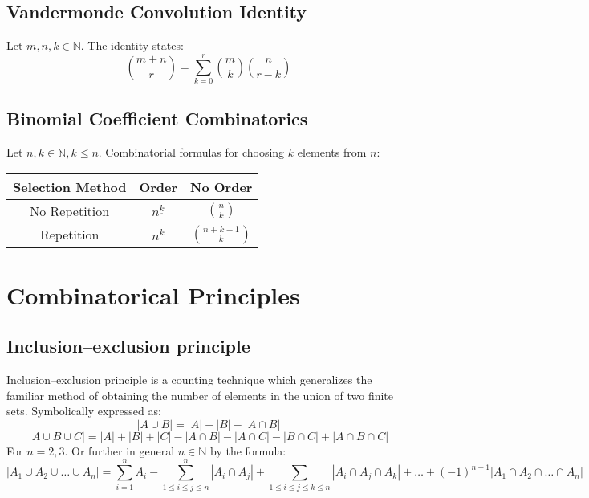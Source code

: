 \documentclass{article}
\newenvironment{definition}[1]{%
    \trivlist
    \item[\hskip\labelsep\textbf{Definition. #1.}]
    \ignorespaces
}{%
    \endtrivlist
}
\newenvironment{theorem}[1]{%
    \trivlist
    \item[\hskip\labelsep\textbf{Theorem. #1.}]
    \ignorespaces
}{%
    \endtrivlist
}
\newenvironment{information}[1]{%
    \trivlist
    \item[\hskip\labelsep\textbf{Information. #1.}]
    \ignorespaces
}{%
    \endtrivlist
}
\begin{document}
\subsection{Vandermonde Convolution Identity}

\begin{theorem}{Vandermonde's Convolution Identity}
    Let $m,n, k \in \mathbb{N}$. The identity states:
    \[\binom{m+n}{r}=\sum _{k=0}^{r}\binom{m}{k}\binom{n}{r-k}\]
\end{theorem}

\subsection{Binomial Coefficient Combinatorics}

\begin{information}{Choosing $k$ elements from $n$}
    Let $n, k \in\mathbb{N}, k\leq n$. Combinatorial formulas for choosing \( k \) elements from \( n \):
    \begin{table}[htbp]
        \centering
        \bgroup
        \def\arraystretch{1.5}%
        \begin{tabular}{|c|c|c|}
            \hline
            \textbf{Selection Method} & \textbf{Order} & \textbf{No Order} \\
            \hline
            No Repetition & \( n^{\underline{k}} \) & \( \binom{n}{k} \) \\
            \hline
            Repetition & \( n^{k} \) & \( \binom{n+k-1}{k} \) \\
            \hline
        \end{tabular}
        \egroup
    \end{table}
\end{information}

\section{Combinatorical Principles}

\subsection{Inclusion–exclusion principle}

\begin{definition}{Inclusion–exclusion principle}
    Inclusion–exclusion principle is a counting technique which generalizes the familiar method of obtaining the number of elements in the union of two finite sets. Symbolically expressed as: 
    \[|A\cup B|=|A|+|B|-|A\cap B|\]
    \[|A\cup B\cup C|=|A|+|B|+|C|-|A\cap B|-|A\cap C|-|B\cap C|+|A\cap B\cap C|\]
    For $n={2,3}$. Or further in general $n\in\mathbb{N}$ by the formula:
    \[|A_1\cup A_2\cup \dots \cup A_n| = 
    \sum_{i=1}^{n} A_i
    - \sum_{1\leq i\leq j\leq n}^{n} |A_i \cap A_j |
    + \sum_{1\leq i\leq j\leq k\leq n} |A_i \cap A_j \cap A_k|
    + \dots 
    + (-1)^{n+1} |A_1\cap A_2\cap \dots \cap A_n|\]
\end{definition}
\end{document}
